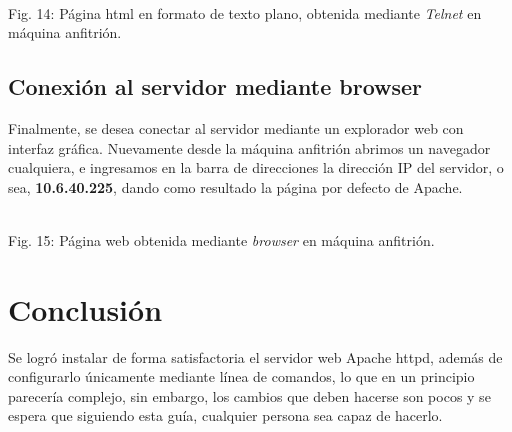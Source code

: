 \documentclass[11pt]{article}
\begin{document}
\begin{minipage}[t]{\linewidth}
    \raggedright
\medskip
     \\Fig. 14: Página html en formato de texto plano, obtenida mediante \textit{Telnet} en máquina anfitrión.\\
\end{minipage}
\newpage
\subsection{Conexión al servidor mediante browser}
Finalmente, se desea conectar al servidor mediante un explorador web con interfaz gráfica. Nuevamente desde la máquina anfitrión abrimos un navegador cualquiera, e ingresamos en la barra de direcciones la dirección IP del servidor, o sea, \textbf{10.6.40.225}, dando como resultado la página por defecto de Apache.\\

\begin{minipage}[t]{\linewidth}
    \raggedright
\medskip
     \\Fig. 15: Página web obtenida mediante \textit{browser} en máquina anfitrión.\\
\end{minipage}

\section{Conclusión}
Se logró instalar de forma satisfactoria el servidor web Apache httpd, además de configurarlo únicamente mediante línea de comandos, lo que en un principio parecería complejo, sin embargo, los cambios que deben hacerse son pocos y se espera que siguiendo esta guía, cualquier persona sea capaz de hacerlo.
\end{document}
